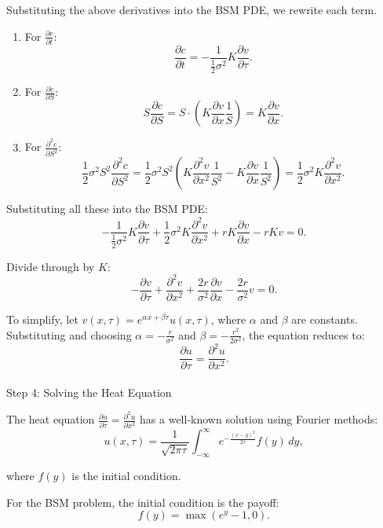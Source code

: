\documentclass[
  letterpaper,
  DIV=11,
  numbers=noendperiod]{scrartcl}
\makeatletter
\let\oldparagraph\paragraph
\renewcommand{\paragraph}{
    \@ifstar
      \xxxParagraphStar
      \xxxParagraphNoStar
  }
\newcommand{\xxxParagraphStar}[1]{\oldparagraph*{#1}\mbox{}}
\newcommand{\xxxParagraphNoStar}[1]{\oldparagraph{#1}\mbox{}}
\makeatother
\begin{document}
Substituting the above derivatives into the BSM PDE, we rewrite each
term.

\begin{enumerate}
\def\labelenumi{\arabic{enumi}.}
\item
  For \(\frac{\partial c}{\partial t}\): \[
  \frac{\partial c}{\partial t} = -\frac{1}{\frac{1}{2} \sigma^2} K \frac{\partial v}{\partial \tau}.
  \]
\item
  For \(\frac{\partial c}{\partial S}\): \[
  S \frac{\partial c}{\partial S} = S \cdot \left(K \frac{\partial v}{\partial x} \frac{1}{S}\right) = K \frac{\partial v}{\partial x}.
  \]
\item
  For \(\frac{\partial^2 c}{\partial S^2}\): \[
  \frac{1}{2} \sigma^2 S^2 \frac{\partial^2 c}{\partial S^2} = \frac{1}{2} \sigma^2 S^2 \left(K \frac{\partial^2 v}{\partial x^2} \frac{1}{S^2} - K \frac{\partial v}{\partial x} \frac{1}{S^2}\right) = \frac{1}{2} \sigma^2 K \frac{\partial^2 v}{\partial x^2}.
  \]
\end{enumerate}

Substituting all these into the BSM PDE: \[
-\frac{1}{\frac{1}{2} \sigma^2} K \frac{\partial v}{\partial \tau} + \frac{1}{2} \sigma^2 K \frac{\partial^2 v}{\partial x^2} + r K \frac{\partial v}{\partial x} - r K v = 0.
\]

Divide through by \(K\): \[
-\frac{\partial v}{\partial \tau} + \frac{\partial^2 v}{\partial x^2} + \frac{2r}{\sigma^2} \frac{\partial v}{\partial x} - \frac{2r}{\sigma^2} v = 0.
\]

To simplify, let \(v(x, \tau) = e^{\alpha x + \beta \tau} u(x, \tau)\),
where \(\alpha\) and \(\beta\) are constants. Substituting and choosing
\(\alpha = -\frac{r}{\sigma^2}\) and
\(\beta = -\frac{r^2}{2 \sigma^2}\), the equation reduces to: \[
\frac{\partial u}{\partial \tau} = \frac{\partial^2 u}{\partial x^2}.
\]

\paragraph{Step 4: Solving the Heat
Equation}\label{step-4-solving-the-heat-equation}

The heat equation
\(\frac{\partial u}{\partial \tau} = \frac{\partial^2 u}{\partial x^2}\)
has a well-known solution using Fourier methods: \[
u(x, \tau) = \frac{1}{\sqrt{2 \pi \tau}} \int_{-\infty}^\infty e^{-\frac{(x-y)^2}{2\tau}} f(y) \, dy,
\]

where \(f(y)\) is the initial condition.

For the BSM problem, the initial condition is the payoff: \[
f(y) = \max(e^y - 1, 0).
\]
\end{document}
